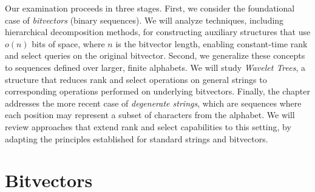 Our examination proceeds in three stages. First, we consider the foundational case of \emph{bitvectors} (binary sequences). We will analyze techniques, including hierarchical decomposition methods, for constructing auxiliary structures that use $o(n)$ bits of space, where $n$ is the bitvector length, enabling constant-time \textsf{rank} and \textsf{select} queries on the original bitvector. Second, we generalize these concepts to sequences defined over larger, finite alphabets. We will study \emph{Wavelet Trees}, a structure that reduces \textsf{rank} and \textsf{select} operations on general strings to corresponding operations performed on underlying bitvectors. Finally, the chapter addresses the more recent case of \emph{degenerate strings}, which are sequences where each position may represent a subset of characters from the alphabet. We will review approaches that extend \textsf{rank} and \textsf{select} capabilities to this setting, by adapting the principles established for standard strings and bitvectors.

\section{Bitvectors} \label{sec:bitvectors}


